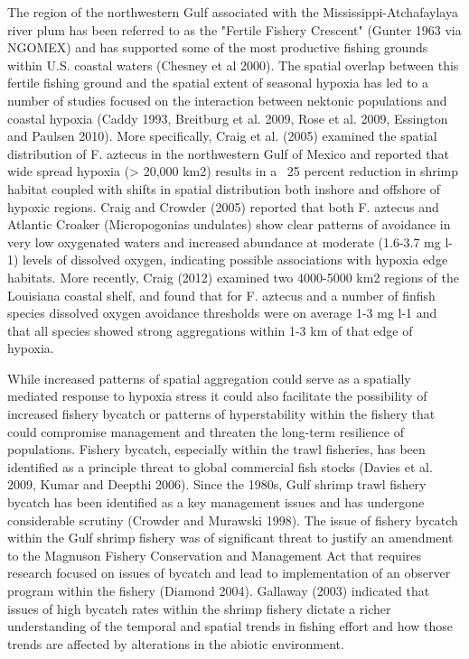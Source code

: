 \documentclass[10pt]{article}
\begin{document}
The region of the northwestern Gulf associated with the Mississippi-Atchafaylaya river plum has been referred to as the "Fertile Fishery Crescent" (Gunter 1963 via NGOMEX) and has supported some of the most productive fishing grounds within U.S. coastal waters (Chesney et al 2000).  The spatial overlap between this fertile fishing ground and the spatial extent of seasonal hypoxia has led to a number of studies focused on the interaction between nektonic populations and coastal hypoxia (Caddy 1993, Breitburg et al. 2009, Rose et al. 2009, Essington and Paulsen 2010).  More specifically, Craig et al. (2005) examined the spatial distribution of F. aztecus in the northwestern Gulf of Mexico and reported that wide spread hypoxia (> 20,000 km2) results in a ~25 percent reduction in shrimp habitat coupled with shifts in spatial distribution both inshore and offshore of hypoxic regions.  Craig and Crowder (2005) reported that both F. aztecus and Atlantic Croaker (Micropogonias undulates) show clear patterns of avoidance in very low oxygenated waters and increased abundance at moderate (1.6-3.7 mg l-1) levels of dissolved oxygen, indicating possible associations with hypoxia edge habitats.  More recently, Craig (2012) examined two 4000-5000 km2 regions of the Louisiana coastal shelf, and found that for F. aztecus and a number of finfish species dissolved oxygen avoidance thresholds were on average 1-3 mg l-1 and that all species showed strong aggregations within 1-3 km of that edge of hypoxia.  

While increased patterns of spatial aggregation could serve as a spatially mediated response to hypoxia stress it could also facilitate the possibility of increased fishery bycatch or patterns of hyperstability within the fishery that could compromise management and threaten the long-term resilience of populations.  Fishery bycatch, especially within the trawl fisheries, has been identified as a principle threat to global commercial fish stocks (Davies et al. 2009, Kumar and Deepthi 2006).  Since the 1980s, Gulf shrimp trawl fishery bycatch has been identified as a key management issues and has undergone considerable scrutiny (Crowder and Murawski 1998).  The issue of fishery bycatch within the Gulf shrimp fishery was of significant threat to justify an amendment to the Magnuson Fishery Conservation and Management Act that requires research focused on issues of bycatch and lead to implementation of an observer program within the fishery (Diamond 2004).  Gallaway (2003) indicated that issues of high bycatch rates within the shrimp fishery dictate a richer understanding of the temporal and spatial trends in fishing effort and how those trends are affected by alterations in the abiotic environment.  
\end{document}
